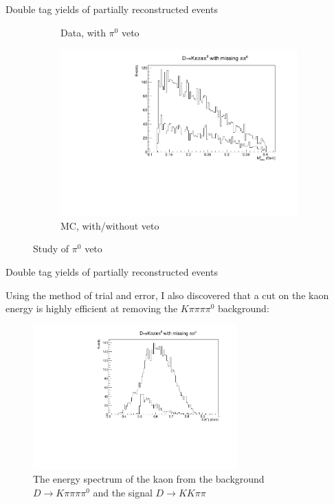 \documentclass{beamer}
\begin{document}
\begin{frame}{Double tag yields of partially reconstructed events}
\begin{figure}
\begin{subfigure}{0.32\textwidth}
      \caption{Data, with $\pi^0$ veto}
    \end{subfigure}%
    \begin{subfigure}{0.32\textwidth}
      \includegraphics[width = 1.0\textwidth]{Plots/Kpipipipi0_Pi0Veto.pdf}
      \caption{MC, with/without veto}
    \end{subfigure}
    \caption{Study of $\pi^0$ veto}
  \end{figure}
\end{frame}

\begin{frame}{Double tag yields of partially reconstructed events}
  \begin{center}
    Using the method of trial and error, I also discovered that a cut on the kaon energy is highly efficient at removing the $K\pi\pi\pi\pi^0$ background:
  \end{center}
  \vspace{-0.2cm}
  \begin{figure}
    \includegraphics[width = 0.7\textwidth]{Plots/Kpipipipi0_KaonEnergyCut.pdf}
    \caption{The energy spectrum of the kaon from the background $D\to K\pi\pi\pi\pi^0$ and the signal $D\to KK\pi\pi$}
  \end{figure}
\end{frame}
\end{document}

